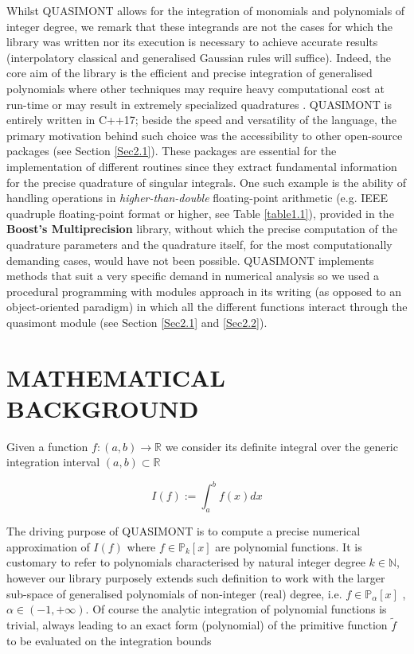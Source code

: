 \documentclass[a4paper, twosided]{book}
\begin{document}
\noindent
Whilst QUASIMONT allows for the integration of monomials and polynomials of integer degree, we remark that these integrands are not the cases for which the library was written nor its execution is necessary to achieve accurate results (interpolatory classical and generalised Gaussian rules will suffice). Indeed, the core aim of the library is the efficient and precise integration of generalised polynomials where other techniques may require heavy computational cost at run-time \cite{Gautschi94} or may result in extremely specialized quadratures \cite{Ma1996,Milovanovic2015}. QUASIMONT is entirely written in C++17; beside the speed and versatility of the language, the primary motivation behind such choice was the accessibility to other open-source packages (see Section \ref{Sec2.1}). These packages are essential for the implementation of different routines since they extract fundamental information for the precise quadrature of singular integrals. One such example is the ability of handling operations in \textsl{higher-than-double} floating-point arithmetic (e.g. IEEE quadruple floating-point format or higher, see Table \ref{table1.1}), provided in the \color{poliDarkBlue} \textbf{Boost's Multiprecision} \color{black} library, without which the precise computation of the quadrature parameters and the quadrature itself, for the most computationally demanding cases, would have not been possible. QUASIMONT implements methods that suit a very specific demand in numerical analysis so we used a procedural programming with modules approach in its writing (as opposed to an object-oriented paradigm) in which all the different functions interact through the \colorbox{poliGrayBlue}{quasimont} \color{black} module (see Section \ref{Sec2.1} and \ref{Sec2.2}).

\section[Mathematical background]{\changefont MATHEMATICAL BACKGROUND}\label{Sec1.2}

\noindent
Given a function $f:(a,b)\to\mathbb{R}$ we consider its definite integral over the generic integration interval $(a,b)\subset\mathbb{R}$

\begin{equation}\label{eq1.1}
    I(f):=\int_{a}^{b}f(x)dx
\end{equation}

\noindent
The driving purpose of QUASIMONT is to compute a precise numerical approximation of $I(f)$ where $f\in\mathbb{P}_{k}[x]$ are polynomial functions. It is customary to refer to polynomials characterised by natural integer degree $k\in\mathbb{N}$, however our library purposely extends such definition to work with the larger sub-space of generalised polynomials of non-integer (real) degree, i.e. $f\in\mathbb{P}_{\alpha}[x]$ , $\alpha\in(-1,+\infty)$. Of course the analytic integration of polynomial functions is trivial, always leading to an exact form (polynomial) of the primitive function $\tilde{f}$ to be evaluated on the integration bounds
\end{document}
